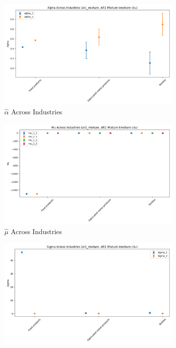 \documentclass{article}
\begin{document}
\begin{figure}[ht!]
    \centering 
    \caption{AR(1) Mixture Model with $\log K$, Import and CIIU Across Industries}
    \begin{subfigure}[t]{0.32\textwidth}
        \centering
        \includegraphics[width=\textwidth]{figure/ar1_mixture_kmshare_ciiu_alpha_across_industries.png}
        \caption{$\hat\alpha$ Across Industries}
    \end{subfigure}
    \begin{subfigure}[t]{0.32\textwidth}
        \centering
        \includegraphics[width=\textwidth]{figure/ar1_mixture_kmshare_ciiu_mu_across_industries.png}
        \caption{$\hat\mu$ Across Industries}
    \end{subfigure}
    \begin{subfigure}[t]{0.32\textwidth}
        \centering
        \includegraphics[width=\textwidth]{figure/ar1_mixture_kmshare_ciiu_sigma_across_industries.png}

\end{subfigure}
\end{figure}
\end{document}
